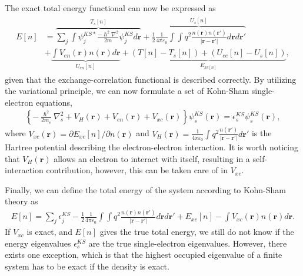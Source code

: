 The exact total energy functional can now be expressed as
\begin{align}
  \begin{aligned}
  E[n]
  &= \overbrace{\sum_j \int \psi_j^{KS*} \frac{-\hslash^2\nabla^2}{2m} \psi_j^{KS}d\boldsymbol{r}}^{T_s[n]} + \overbrace{\frac{1}{2}\frac{1}{4\pi\varepsilon_0}\int \int q^2\frac{n(\boldsymbol{r})n(\boldsymbol{r}')}{\lvert \boldsymbol{r}-\boldsymbol{r}'\rvert} d\boldsymbol{r}d\boldsymbol{r}'}^{U_s[n]}
  \\ &+ \underbrace{\int V_{en}(\boldsymbol{r})n(\boldsymbol{r})d\boldsymbol{r}}_{U_{en}[n]} + \underbrace{\left(T[n] - T_s[n] \right) + \left( U_{ee}[n] - U_s[n] \right)}_{E_{xc[n]}},
  \end{aligned}
\end{align}
given that the exchange-correlation functional is described correctly. By utilizing the variational principle, we can now formulate a set of Kohn-Sham single-electron equations,
\begin{align}
  \left\{ -\frac{\hslash^2}{2m_e}\nabla^2_s + V_H(\boldsymbol{r}) + V_{en}(\boldsymbol{r}) + V_{xc}(\boldsymbol{r}) \right\} \psi_s^{KS}(\boldsymbol{r}) = \epsilon_s^{KS} \psi_s^{KS}(\boldsymbol{r}),
  \label{eq:singleKS}
\end{align}
where $V_{xc}(\boldsymbol{r})=\partial E_{xc}[n]/\partial n(\boldsymbol{r})$ and $V_{H}(\boldsymbol{r})=\frac{1}{4\pi\varepsilon_0}\int q^2 \frac{n(\boldsymbol{r'})}{\lvert \boldsymbol{r} - \boldsymbol{r}'\rvert} d\boldsymbol{r}'$ is the Hartree potential describing the electron-electron interaction.
It is worth noticing that $V_H(\boldsymbol{r})$ allows an electron to interact with itself, resulting in a self-interaction contribution, however, this can be taken care of in $V_{xc}$.

Finally, we can define the total energy of the system according to Kohn-Sham theory as
\begin{align}
  E[n] = \sum_{j}\epsilon_j^{KS}-\frac{1}{2}\frac{1}{4\pi\varepsilon_0}\int \int q^2 \frac{n(\boldsymbol{r})n(\boldsymbol{r}')}{\lvert \boldsymbol{r} - \boldsymbol{r}' \rvert} d\boldsymbol{r}d\boldsymbol{r}' + E_{xc}[n] - \int V_{xc}(\boldsymbol{r})n(\boldsymbol{r})d\boldsymbol{r}.
\end{align}
If $V_{xc}$ is exact, and $E[n]$ gives the true total energy, we still do not know if the energy eigenvalues $\epsilon_s^{KS}$ are the true single-electron eigenvalues. However, there exists one exception, which is that the highest occupied eigenvalue of a finite system has to be exact if the density is exact.

